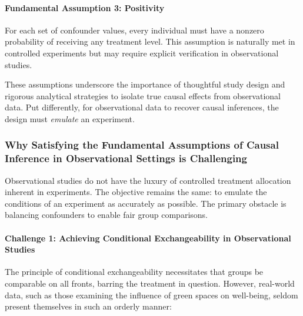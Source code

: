 \documentclass[
  singlecolumn]{article}
\let\oldparagraph\paragraph
\renewcommand{\paragraph}[1]{\oldparagraph{#1}\mbox{}}
\begin{document}
\paragraph{Fundamental Assumption 3:
Positivity}\label{fundamental-assumption-3-positivity}

For each set of confounder values, every individual must have a nonzero
probability of receiving any treatment level. This assumption is
naturally met in controlled experiments but may require explicit
verification in observational studies.

These assumptions underscore the importance of thoughtful study design
and rigorous analytical strategies to isolate true causal effects from
observational data. Put differently, for observational data to recover
causal inferences, the design must \emph{emulate} an experiment.

\subsubsection{Why Satisfying the Fundamental Assumptions of Causal
Inference in Observational Settings is
Challenging}\label{why-satisfying-the-fundamental-assumptions-of-causal-inference-in-observational-settings-is-challenging}

Observational studies do not have the luxury of controlled treatment
allocation inherent in experiments. The objective remains the same: to
emulate the conditions of an experiment as accurately as possible. The
primary obstacle is balancing confounders to enable fair group
comparisons.

\paragraph{Challenge 1: Achieving Conditional Exchangeability in
Observational
Studies}\label{challenge-1-achieving-conditional-exchangeability-in-observational-studies}

The principle of conditional exchangeability necessitates that groups be
comparable on all fronts, barring the treatment in question. However,
real-world data, such as those examining the influence of green spaces
on well-being, seldom present themselves in such an orderly manner:
\end{document}
